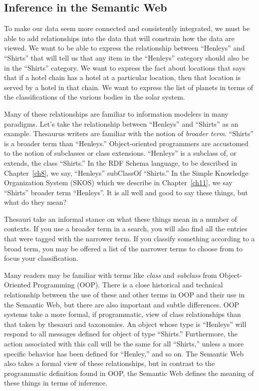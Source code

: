 \subsection{Inference in the Semantic Web}

To make our data seem more connected and consistently integrated, we
must be able to add relationships into the data that will constrain how
the data are viewed. We want to be able to express the relationship
between ``Henleys'' and ``Shirts'' that will tell us that any item in
the ``Henleys'' category should also be in the ``Shirts'' category. We
want to express the fact about locations that says that if a hotel chain
has a hotel at a particular location, then that location is served by a
hotel in that chain. We want to express the list of planets in terms of
the classifications of the various bodies in the solar system.

Many of these relationships are familiar to information modelers in many
paradigms. Let's take the relationship between ``Henleys'' and
``Shirts'' as an example. Thesaurus writers are familiar with the notion
of \emph{broader term}. ``Shirts'' is a broader term than ``Henleys.''
Object-oriented programmers are accustomed to the notion of subclasses
or class extensions. ``Henleys'' is a subclass of, or extends, the class
``Shirts.'' In the RDF Schema language, to be described in Chapter~\ref{ch8}, we say, ``Henleys'' subClassOf ``Shirts.''  
In the Simple Knowledge Organization System (SKOS) which we describe in Chapter~\ref{ch11}, we say ``Shirts'' broader term ``Henleys''. 
It is all well and
good to say these things, but what do they mean?

Thesauri take an informal stance on what these things mean in a number
of contexts. If you use
a broader term in a search, you will also find all the entries that were
tagged with the narrower term. If you classify something according to a
broad term, you may be offered a list of the narrower terms to choose
from to focus your classification.

\begin{sidebar}{}
Many readers may be familiar with terms like \emph{class} and
\emph{subclass} from Object-Oriented Programming (OOP). There is a close
historical and technical relationship between the use of these and other
terms in OOP and their use in the Semantic Web, but there are also
important and subtle differences. OOP systems take a more formal, if
programmatic, view of class relationships than that taken by thesauri
and taxonomies. An object whose type is ``Henleys'' will respond to all
messages defined for object of type ``Shirts.'' Furthermore, the action
associated with this call will be the same for all ``Shirts,'' unless a
more specific behavior has been defined for ``Henley,'' and so on. The
Semantic Web also takes a formal view of these relationships, but in
contrast to the programmatic definition found in OOP, the Semantic Web
defines the meaning of these things in terms of inference.
\end{sidebar}



